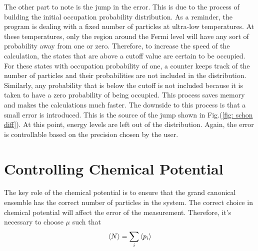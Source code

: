 
The other part to note is the jump in the error. This is due to the process of building the initial occupation probability distribution. As a reminder, the program is dealing with a fixed number of particles at ultra-low temperatures. At these temperatures, only the region around the Fermi level will have any sort of probability away from one or zero. Therefore, to increase the speed of the calculation, the states that are above a cutoff value are certain to be occupied. For these states with occupation probability of one, a counter keeps track of the number of particles and their probabilities are not included in the distribution. Similarly, any probability that is below the cutoff is not included because it is taken to have a zero probability of being occupied. This process saves memory and makes the calculations much faster. The downside to this process is that a small error is introduced. This is the source of the jump shown in Fig.\@ (\ref{fig: schon diff}). At this point, energy levels are left out of the distribution. Again, the error is controllable based on the precision chosen by the user.

\section{Controlling Chemical Potential}
The key role of the chemical potential is to ensure that the grand canonical ensemble has the correct number of particles in the system. The correct choice in chemical potential will affect the error of the measurement. Therefore, it's necessary to choose $\mu$ such that 
\begin{equation}
    \left<{N}\right>=\sum_i \left<{p_i}\right>
\end{equation}


